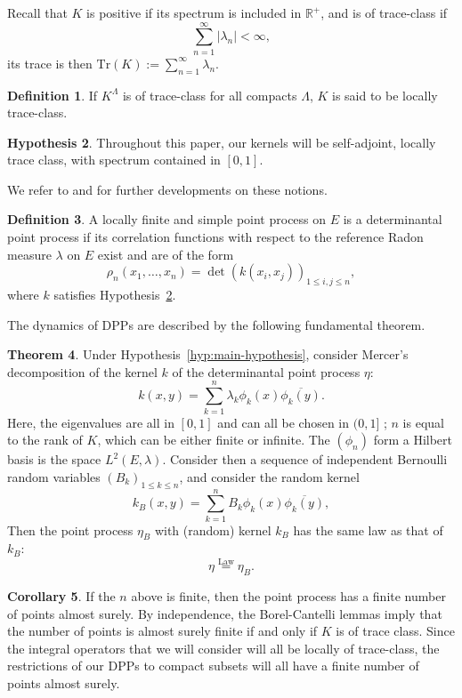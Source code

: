 \documentclass[11pt]{article}
\theoremstyle{plain}
\theoremstyle{definition}
\newtheorem{definition}{Definition}
\newtheorem{theorem}[definition]{Theorem}
\newtheorem{corollary}[definition]{Corollary}
\newtheorem{hypothesis}[definition]{Hypothesis}
\begin{document}
Recall that $K$ is positive if its spectrum is included in $\mathbb{R}^+$, and is of trace-class if $$ \sum_{n=1}^\infty |\lambda_n| < \infty,$$ its trace is then $\mathrm{Tr}(K) := \sum_{n=1}^\infty \lambda_n$.

\begin{definition}
    If $K^\Lambda$ is of trace-class for all compacts $\Lambda$, $K$ is said to be locally trace-class.
\end{definition}

\begin{hypothesis} \label{hyp:mainhypothesis}
    Throughout this paper, our kernels will be self-adjoint, locally trace class, with spectrum contained in $[0, 1]$.
\end{hypothesis}

We refer to \cite{ConwayOpTheory2000} and \cite{ConwayFunctAnalysis2019} for further developments on these notions.

\begin{definition} 
    A locally finite and simple point process on $E$ is a determinantal point process if its correlation functions with respect to the reference Radon measure $\lambda$ on $E$ exist and are of the form
    \[
        \rho_n(x_1, \dots, x_n) = \det(k(x_i, x_j))_{1 \le i,j \le n},
    \] where $k$ satisfies Hypothesis~\ref{hyp:mainhypothesis}.
\end{definition}

The dynamics of DPPs are described by the following fundamental theorem.

\begin{theorem} \label{thm:main-dpp-thm}
Under Hypothesis~\ref{hyp:main-hypothesis}, consider Mercer's decomposition of the kernel $k$ of the determinantal point process $\eta$:
\[
k(x,y) = \sum_{k=1}^n \lambda_k \phi_k(x) \overline{\phi_k(y)}.
\]
Here, the eigenvalues are all in $[0,1]$ and can all be chosen in $(0,1]$ ; $n$ is equal to the rank of $K$, which can be either finite or infinite. The $(\phi_n)$ form a Hilbert basis is the space $L^2(E, \lambda)$. Consider then a sequence of independent Bernoulli random variables $(B_k)_{1 \le k \le n}$, and consider the random kernel
\[
k_B(x, y) = \sum_{k=1}^n B_k \phi_k(x) \overline{\phi_k(y)},
\]
Then the point process $\eta_B$ with (random) kernel $k_B$ has the same law as that of $k_B$:
\[
\eta \overset{\text{Law}}{=} \eta_B.
\]
\end{theorem}

\begin{corollary}
If the $n$ above is finite, then the point process has a finite number of points almost surely. By independence, the Borel-Cantelli lemmas imply that the number of points is almost surely finite if and only if $K$ is of trace class. Since the integral operators that we will consider will all be locally of trace-class, the restrictions of our DPPs to compact subsets will all have a finite number of points almost surely.
\end{corollary}
\end{document}
